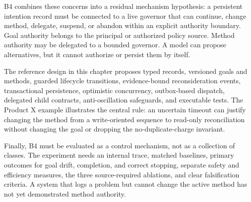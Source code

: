 B4 combines these concerns into a residual mechanism hypothesis: a persistent intention record must be connected to a live governor that can continue, change method, delegate, suspend, or abandon within an explicit authority boundary. Goal authority belongs to the principal or authorized policy source. Method authority may be delegated to a bounded governor. A model can propose alternatives, but it cannot authorize or persist them by itself.

The reference design in this chapter proposes typed records, versioned goals and methods, guarded lifecycle transitions, evidence-bound reconsideration events, transactional persistence, optimistic concurrency, outbox-based dispatch, delegated child contracts, anti-oscillation safeguards, and executable tests. The Product X example illustrates the central rule: an uncertain timeout can justify changing the method from a write-oriented sequence to read-only reconciliation without changing the goal or dropping the no-duplicate-charge invariant.

Finally, B4 must be evaluated as a control mechanism, not as a collection of classes. The experiment needs an internal trace, matched baselines, primary outcomes for goal drift, completion, and correct stopping, separate safety and efficiency measures, the three source-required ablations, and clear falsification criteria. A system that logs a problem but cannot change the active method has not yet demonstrated method authority.

